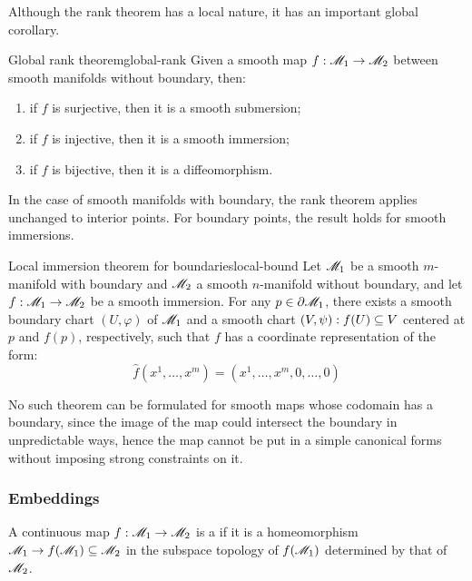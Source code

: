 Although the rank theorem has a local nature, it has an important global corollary.

\begin{corollary}{Global rank theorem}{global-rank}
  Given a smooth map $ f : \mathscr{M}_1 \rightarrow \mathscr{M}_2 $ between smooth manifolds without boundary, then:
  \begin{enumerate}
    \item if $ f $ is surjective, then it is a smooth submersion;
    \item if $ f $ is injective, then it is a smooth immersion;
    \item if $ f $ is bijective, then it is a diffeomorphism.
  \end{enumerate}
\end{corollary}

In the case of smooth manifolds with boundary, the rank theorem applies unchanged to interior points. For boundary points, the result holds for smooth immersions.

\begin{theorem}{Local immersion theorem for boundaries}{local-bound}
  Let $ \mathscr{M}_1 $ be a smooth $ m $-manifold with boundary and $ \mathscr{M}_2 $ a smooth $ n $-manifold without boundary, and let $ f : \mathscr{M}_1 \rightarrow \mathscr{M}_2 $ be a smooth immersion. For any $ p \in \partial \mathscr{M}_1 $, there exists a smooth boundary chart $ (U,\varphi) $ of $ \mathscr{M}_1 $ and a smooth chart $ (V,\psi) : f(U) \subseteq V $ centered at $ p $ and $ f(p) $, respectively, such that $ f $ has a coordinate representation of the form:
  \begin{equation}
    \hat{f}(x^1 , \dots , x^m) = (x^1 , \dots , x^m , 0 , \dots , 0)
    \label{eq:local-immersion}
  \end{equation}
\end{theorem}

No such theorem can be formulated for smooth maps whose codomain has a boundary, since the image of the map could intersect the boundary in unpredictable ways, hence the map cannot be put in a simple canonical forms without imposing strong constraints on it.

\subsubsection{Embeddings}

A continuous map $ f : \mathscr{M}_1 \rightarrow \mathscr{M}_2 $ is a  if it is a homeomorphism $ \mathscr{M}_1 \rightarrow f(\mathscr{M}_1) \subseteq \mathscr{M}_2 $ in the subspace topology of $ f(\mathscr{M}_1) $ determined by that of $ \mathscr{M}_2 $.

